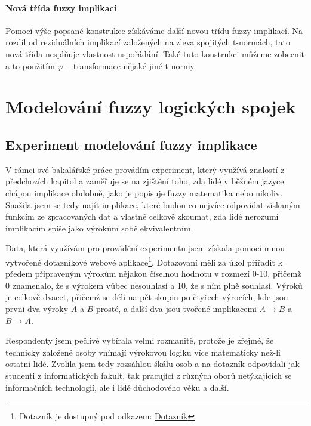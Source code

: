 \subsubsection{Nová třída fuzzy implikací}
Pomocí výše popsané konstrukce získáváme další novou třídu fuzzy implikací. Na rozdíl od reziduálních implikací založených na zleva spojitých t-normách, tato nová třída nespl\v nuje vlastnost uspořádání. Také tuto konstrukci můžeme zobecnit a to použitím $\varphi-$transformace nějaké jiné t-normy.


\chapter{Modelování fuzzy logických spojek}

\section{Experiment modelování fuzzy implikace}
V rámci své bakalářské práce provádím experiment, který využívá znalostí z předchozích kapitol a zaměřuje se na zjištění toho, zda lidé v běžném jazyce chápou implikace obdobně, jako je popisuje fuzzy matematika nebo nikoliv. Snažila jsem se tedy najít implikace, které budou co nejvíce odpovídat získaným funkcím ze zpracovaných dat a vlastně celkově zkoumat, zda lidé nerozumí implikacím spíše jako výrok\r um sobě ekvivalentním.

Data, která využívám pro provádění experimentu jsem získala pomocí mnou vytvořené dotazníkové webové aplikace\footnote{Dotazník je dostupný pod odkazem: \href{https://www.stud.fit.vutbr.cz/~xjirmu00/bp/}{Dotazník}}. Dotazovaní měli za \' ukol přiřadit k předem připraveným výrok\r um nějakou číselnou hodnotu v rozmezí 0-10, přičemž 0 znamenalo, že s výrokem v\r ubec nesouhlasí a 10, že s ním plně souhlasí. Výrok\r u je celkově dvacet, přičemž se dělí na pět skupin po čtyřech výrocích, kde jsou první dva výroky $A$ a $B$ prosté, a další dva jsou tvořené implikacemi $A \to B$ a $B \to A$.

Respondenty jsem pečlivě vybírala velmi rozmanitě, protože je zřejmé, že technicky založené osoby vnímají výrokovou logiku více matematicky než-li ostatní lidé. Zvolila jsem tedy rozsáhlou škálu osob a na dotazník odpovídali jak studenti z informatických fakult, tak pracující z r\r uzných obor\r u netýkajících se informačních technologií, ale i lidé d\r uchodového věku a další.

